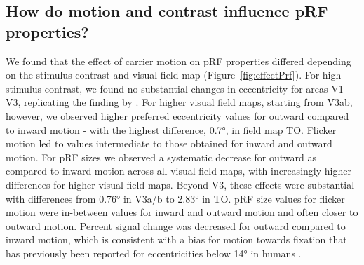 \subsection{How do motion and contrast influence pRF properties?}
We found that the effect of carrier motion on pRF properties differed depending on the stimulus contrast and visual field map (Figure~\ref{fig:effectPrf}). For high stimulus contrast, we found no substantial changes in eccentricity for areas V1 - V3, replicating the finding by \cite{Liu2006}. For higher visual field maps, starting from V3ab, however, we observed higher preferred eccentricity values for outward compared to inward motion - with the highest difference, 0.7°, in field map TO. Flicker motion led to values intermediate to those obtained for inward and outward motion. For pRF sizes we observed a systematic decrease for outward as compared to inward motion across all visual field maps, with increasingly higher differences for higher visual field maps. Beyond V3, these effects were substantial with differences from 0.76° in V3a/b to 2.83° in TO. pRF size values for flicker motion were in-between values for inward and outward motion and often closer to outward motion. Percent signal change was decreased for outward compared to inward motion, which is consistent with a bias for motion towards fixation that has previously been reported for eccentricities below 14° in humans \parencite{Wang2014}.

